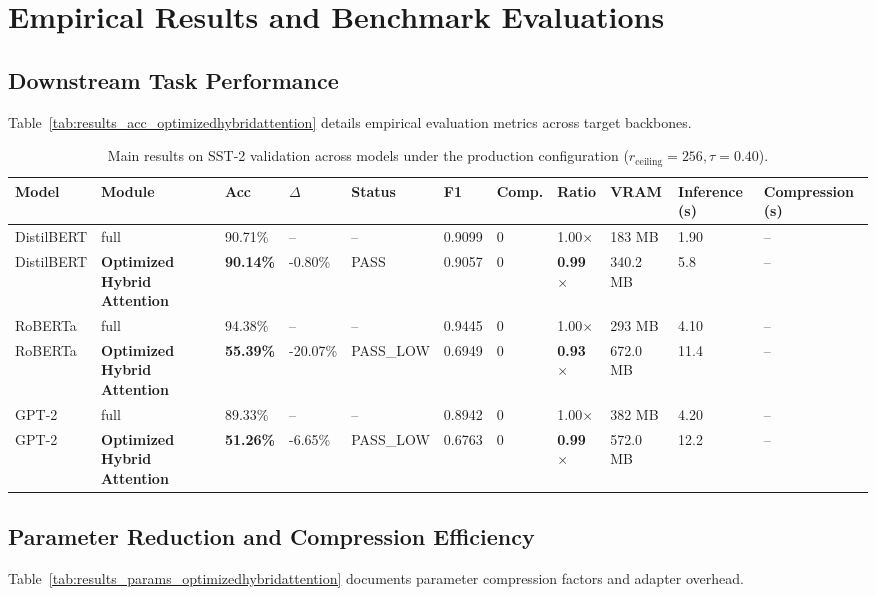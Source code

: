 \section{Empirical Results and Benchmark Evaluations}

\subsection{Downstream Task Performance}
Table~\ref{tab:results_acc_optimizedhybridattention} details empirical evaluation metrics across target backbones.

\begin{table}[t]
\centering
\small
\begin{tabular}{lllllllllll}
\toprule
\textbf{Model} & \textbf{Module} & \textbf{Acc} & \textbf{$\Delta$} & \textbf{Status} & \textbf{F1} & \textbf{Comp.} & \textbf{Ratio} & \textbf{VRAM} & \textbf{Inference (s)} & \textbf{Compression (s)} \\
\midrule
DistilBERT & full & 90.71\% & -- & -- & 0.9099 & 0 & 1.00$\times$ & 183 MB & 1.90 & -- \\
DistilBERT & \textbf{Optimized Hybrid Attention} & \textbf{90.14\%} & -0.80\% & PASS & 0.9057 & 0 & \textbf{0.99$\times$} & 340.2 MB & 5.8 & -- \\
RoBERTa & full & 94.38\% & -- & -- & 0.9445 & 0 & 1.00$\times$ & 293 MB & 4.10 & -- \\
RoBERTa & \textbf{Optimized Hybrid Attention} & \textbf{55.39\%} & -20.07\% & PASS\_LOW & 0.6949 & 0 & \textbf{0.93$\times$} & 672.0 MB & 11.4 & -- \\
GPT-2 & full & 89.33\% & -- & -- & 0.8942 & 0 & 1.00$\times$ & 382 MB & 4.20 & -- \\
GPT-2 & \textbf{Optimized Hybrid Attention} & \textbf{51.26\%} & -6.65\% & PASS\_LOW & 0.6763 & 0 & \textbf{0.99$\times$} & 572.0 MB & 12.2 & -- \\
\bottomrule
\end{tabular}
\caption{Main results on SST-2 validation across models under the production configuration ($r_{\mathrm{ceiling}}=256, \tau=0.40$).}
\label{tab:main_sst2}
\end{table}

\subsection{Parameter Reduction and Compression Efficiency}
Table~\ref{tab:results_params_optimizedhybridattention} documents parameter compression factors and adapter overhead.

